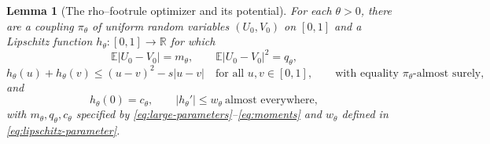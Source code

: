 \documentclass{article}
\newtheorem{lemma}[theorem]{Lemma}
\theoremstyle{definition}
\theoremstyle{remark}
\newcommand{\1}{\mathds{1}}
\newcommand{\E}{\mathbb{E}}
\newcommand{\I}{[0,1]}
\begin{document}
\begin{lemma}[The rho--footrule optimizer and its potential]\label{lem:input}
	For each $\theta>0$, there are a coupling $\pi_\theta$ of uniform random variables $(U_0,V_0)$ on $\I$ and a Lipschitz function $h_\theta\colon\I\to\mathbb{R}$ for which
	\begin{equation}\label{eq:input-moments}
		\E|U_0-V_0|=m_\theta,\qquad\E|U_0-V_0|^2=q_\theta,
	\end{equation}
	\begin{equation}\label{eq:input-dual}
		h_\theta(u)+h_\theta(v)\le(u-v)^2-s|u-v|\quad\text{for all }u,v\in\I,
		\qquad\text{with equality $\pi_\theta$-almost surely,}
	\end{equation}
	and
	\begin{equation}\label{eq:input-endpoint}
		h_\theta(0)=c_\theta,\qquad|h_\theta'|\le w_\theta\ \text{almost everywhere},
	\end{equation}
	with $m_\theta,q_\theta,c_\theta$ specified by \eqref{eq:large-parameters}--\eqref{eq:moments} and $w_\theta$ defined in \eqref{eq:lipschitz-parameter}.
\end{lemma}
\end{document}
